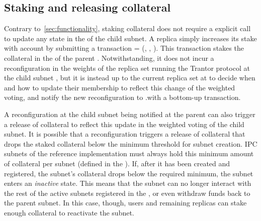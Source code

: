 \subsection{Staking and releasing collateral}
Contrary to~\cref{sec:functionality}, staking collateral does not require a explicit call to update any state in the \gw of the child subnet. A replica simply increases its stake with account  by submitting a transaction  = (, , ). This transaction stakes the collateral in the \gw of the parent . Notwithstanding, it does not incur a reconfiguration in the weights of the replica set running the Trantor protocol at the child subnet , but it is instead up to the current replica set at  to decide when and how to update their membership to reflect this change of the weighted voting, and notify the new reconfiguration to .\gw with a bottom-up transaction. 

A reconfiguration at the child subnet being notified at the parent can also trigger a release of collateral to reflect this update in the weighted voting of the child subnet. It is possible that a reconfiguration triggers a release of collateral that drops the staked collateral below the minimum threshold for subnet creation. IPC subnets of the reference implementation must always hold this minimum amount of collateral per subnet (defined in the \gw). If, after it has been created and registered, the subnet's collateral drops below the required minimum, the subnet enters an \emph{inactive} state. This means that the subnet can no longer interact with the rest of the active subnets registered in the \gw, or even withdraw funds back to the parent subnet. In this case, though, users and remaining replicas can stake enough collateral to reactivate the subnet. 
